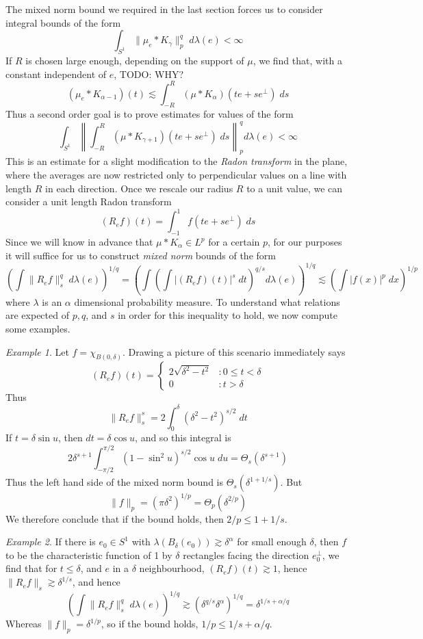 \documentclass{article}
\theoremstyle{plain}
\theoremstyle{remark}
\newtheorem*{example}{Example}
\theoremstyle{definition}
\begin{document}
The mixed norm bound we required in the last section forces us to consider integral bounds of the form
%
\[ \int_{S^1} \| \mu_e * K_\gamma \|_p^q\; d\lambda(e) < \infty \]
%
If $R$ is chosen large enough, depending on the support of $\mu$, we find that, with a constant independent of $e$, TODO: WHY?
%
\[ (\mu_e * K_{\alpha - 1})(t) \lesssim \int_{-R}^R (\mu * K_\alpha)(t e + s e^\perp)\; ds \]
%
Thus a second order goal is to prove estimates for values of the form
%
\[ \int_{S^1} \left\| \int_{-R}^R (\mu * K_{\gamma+1})(te + se^\perp)\; ds \right\|_p^q d\lambda(e) < \infty \]
%
This is an estimate for a slight modification to the {\it Radon transform} in the plane, where the averages are now restricted only to perpendicular values on a line with length $R$ in each direction. Once we rescale our radius $R$ to a unit value, we can consider a unit length Radon transform
%
\[ (R_e f)(t) = \int_{-1}^1 f(te + se^\perp)\; ds \]
%
Since we will know in advance that $\mu * K_\alpha \in L^p$ for a certain $p$, for our purposes it will suffice for us to construct {\it mixed norm} bounds of the form
%
\[ \left( \int \| R_e f \|_s^q\; d\lambda(e) \right)^{1/q} = \left( \int \left( \int |(R_e f)(t)|^s\; dt \right)^{q/s} d\lambda(e) \right)^{1/q} \lesssim \left( \int |f(x)|^p\; dx \right)^{1/p} \]
%
where $\lambda$ is an $\alpha$ dimensional probability measure. To understand what relations are expected of $p,q$, and $s$ in order for this inequality to hold, we now compute some examples.

\begin{example}
	Let $f = \chi_{B(0,\delta)}$. Drawing a picture of this scenario immediately says
	\[ (R_e f)(t) = \begin{cases} 2 \sqrt{\delta^2 - t^2} &: 0 \leq t < \delta \\ 0 &: t > \delta \end{cases} \]
	Thus
	\[ \| R_e f \|_s^s = 2 \int_0^\delta (\delta^2 - t^2)^{s/2}\; dt \]
	If $t = \delta \sin u$, then $dt = \delta \cos u$, and so this integral is
	\[ 2 \delta^{s+1} \int_{-\pi/2}^{\pi/2} (1 - \sin^2 u)^{s/2} \cos u\; du = \Theta_s(\delta^{s+1}) \]
	Thus the left hand side of the mixed norm bound is $\Theta_s(\delta^{1+1/s})$. But
	\[ \| f \|_p = (\pi \delta^2)^{1/p} = \Theta_p(\delta^{2/p}) \]
	We therefore conclude that if the bound holds, then $2/p \leq 1 + 1/s$.
\end{example}

\begin{example}
	If there is $e_0 \in S^1$ with $\lambda(B_\delta(e_0)) \gtrsim \delta^\alpha$ for small enough $\delta$, then $f$ to be the characteristic function of 1 by $\delta$ rectangles facing the direction $e_0^\perp$, we find that for $t \leq \delta$, and $e$ in a $\delta$ neighbourhood, $(R_ef)(t) \gtrsim 1$, hence $\| R_e f \|_s \gtrsim \delta^{1/s}$, and hence
	\[ \left( \int \| R_e f \|_s^q\; d\lambda(e) \right)^{1/q} \gtrsim (\delta^{q/s} \delta^\alpha)^{1/q} = \delta^{1/s + \alpha/q} \]
	Whereas $\| f \|_p = \delta^{1/p}$, so if the bound holds, $1/p \leq 1/s + \alpha/q$.
\end{example}
\end{document}
